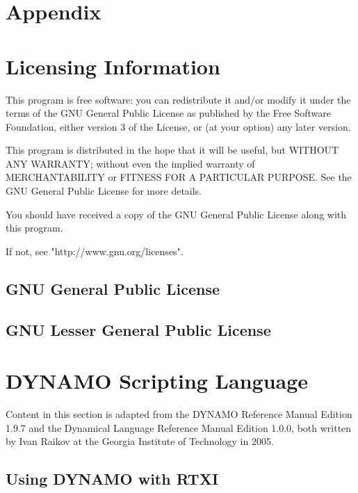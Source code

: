 \clearpage

\chapter*{Appendix}

\appendix

\chapter{Licensing Information}
This program is free software: you can redistribute it and/or modify it under the terms of the GNU General Public License as published by the Free Software Foundation, either version 3 of the License, or (at your option) any later version.

This program is distributed in the hope that it will be useful, but WITHOUT ANY WARRANTY; without even the implied warranty of MERCHANTABILITY or FITNESS FOR A PARTICULAR PURPOSE.  See the GNU General Public License for more details.

You should have received a copy of the GNU General Public License along with this program.  

If not, see "http://www.gnu.org/licenses".
\bigskip


\section{GNU General Public License}



\section{GNU Lesser General Public License}



\chapter{DYNAMO Scripting Language}
\label{dynamo appendix}
Content in this section is adapted from the DYNAMO Reference Manual Edition 1.9.7 and the Dynamical Language Reference Manual Edition 1.0.0, both written by Ivan Raikov at the Georgia Institute of Technology in 2005.

\section{Using DYNAMO with RTXI}

